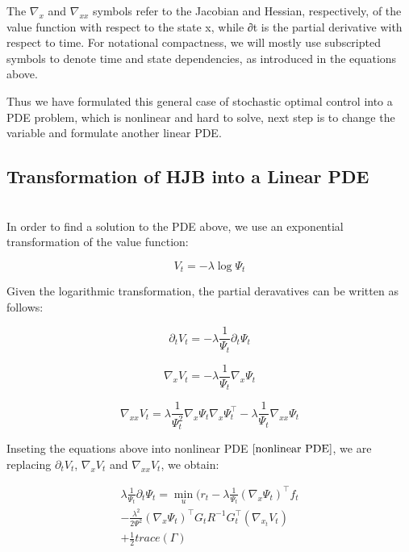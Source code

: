 \documentclass[journal]{IEEEtran}
\begin{document}
The $\nabla_x$ and $\nabla_{xx}$ symbols refer to the Jacobian and Hessian, respectively, of the value function with respect to the state x, while ∂t is the partial derivative with respect to time. For notational compactness, 
we will mostly use subscripted symbols to denote time and state dependencies, as introduced in the equations above.

Thus we have formulated this general case of stochastic optimal control into a PDE problem, which is nonlinear and hard to solve, next step is to change the variable and formulate another
linear PDE.
 \ \\

\subsection{Transformation of HJB into a Linear PDE}
\ \\

In order to find a solution to the PDE above, we use an exponential transformation of the value function:

\begin{equation}
  V_t = -\lambda \log \Psi_t \nonumber
\end{equation}

Given the logarithmic transformation, the partial deravatives can be written as follows:

\begin{equation}
  \partial_tV_t = -\lambda \frac{1}{\Psi_t}\partial_t \Psi_t \nonumber
\end{equation}

\begin{equation}
  \nabla_xV_t = -\lambda \frac{1}{\Psi_t}\nabla_x \Psi_t \nonumber
\end{equation}

\begin{equation}
  \nabla_{xx}V_t = \lambda \frac{1}{\Psi_t^2}\nabla_x \Psi_t\nabla_x \Psi_t^{\top} -\lambda \frac{1}{\Psi_t}\nabla_{xx} \Psi_t \nonumber
\end{equation}

Inseting the equations above into nonlinear PDE $\ref{nonlinear PDE}$, we are replacing $\partial_tV_t$, $\nabla_xV_t$ and $\nabla_{xx}V_t$,
we obtain:

\begin{equation}
  \begin{aligned}
  \lambda \frac{1}{\Psi_t}\partial_t \Psi_t = \min_u (r_t -\lambda \frac{1}{\Psi_t}(\nabla_x \Psi_t )^{\top}f_t \\ -\frac{\lambda^2}{2\Psi^2}(\nabla_x \Psi_t )^{\top}G_tR^{-1}G_t^{\top}(\nabla_{x_t}V_t) \\
   + \frac{1}{2}trace(\Gamma) 
  \label{nonlinear PDE2}
  \end{aligned}
\end{equation}
\end{document}
